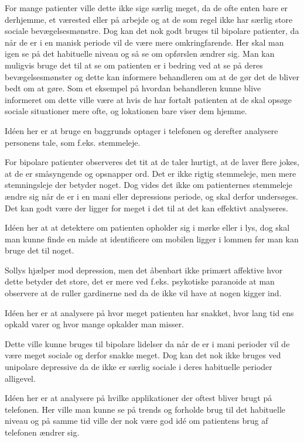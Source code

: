 \begin{description}[style=nextline]
	For mange patienter ville dette ikke sige særlig meget, da de ofte enten bare er derhjemme, et værested eller på arbejde og at de som regel ikke har særlig store sociale bevægelsesmønstre. 
	Dog kan det nok godt bruges til bipolare patienter, da når de er i en manisk periode vil de være mere omkringfarende. 
	Her skal man igen se på det habituelle niveau og så se om opførslen ændrer sig. 
	Man kan muligvis bruge det til at se om patienten er i bedring ved at se på deres bevægelsesmønster og dette kan informere behandleren om at de gør det de bliver bedt om at gøre. 
	Som et eksempel på hvordan behandleren kunne blive informeret om dette ville være at hvis de har fortalt patienten at de skal opsøge sociale situationer mere ofte, og lokationen bare viser dem hjemme.
\item[Lyd]
	Idéen her er at bruge en baggrunds optager i telefonen og derefter analysere personens tale, som f.eks. stemmeleje. 
	
	For bipolare patienter observeres det tit at de taler hurtigt, at de laver flere jokes, at de er småsyngende og opsnapper ord. Det er ikke rigtig stemmeleje, men mere stemningsleje der betyder noget. 
	Dog vides det ikke om patienternes stemmeleje ændre sig når de er i en mani eller depressions periode, og skal derfor undersøges.
	Det kan godt være der ligger for meget i det til at det kan effektivt analyseres. 
\item[Lys]
	Idéen her at at detektere om patienten opholder sig i mørke eller i lys, dog skal man kunne finde en måde at identificere om mobilen ligger i lommen før man kan bruge det til noget.
	
	Sollys hjælper mod depression, men det åbenbart ikke primært affektive hvor dette betyder det store, det er mere ved f.eks. psykotiske paranoide at man observere at de ruller gardinerne ned da de ikke vil have at nogen kigger ind. 
\item[Opkaldsoversigt]
	Idéen her er at analysere på hvor meget patienten har snakket, hvor lang tid ens opkald varer og hvor mange opkalder man misser.
	
	Dette ville kunne bruges til bipolare lidelser da når de er i mani perioder vil de være meget sociale og derfor snakke meget. 
	Dog kan det nok ikke bruges ved unipolare depressive da de ikke er særlig sociale i deres habituelle perioder alligevel.
\item[Applikation brug]
	Idéen her er at analysere på hvilke applikationer der oftest bliver brugt på telefonen. Her ville man kunne se på trends og forholde brug til det habituelle niveau og på samme tid ville der nok være god idé om patientens brug af telefonen ændrer sig.
	

\end{description}
